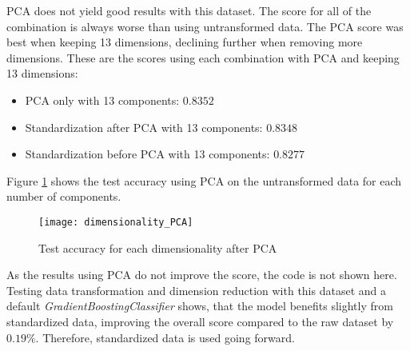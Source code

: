 \ac{PCA} does not yield good results with this dataset. The score for all of the combination is always worse
than using untransformed data. 
The PCA score was best when keeping 13 dimensions, declining further when removing more dimensions.
These are the scores using each combination with PCA and keeping 13 dimensions:

\begin{itemize}
    \item PCA only with 13 components: $0.8352$
    \item Standardization after PCA with 13 components: $0.8348$
    \item Standardization before PCA with 13 components: $0.8277$
\end{itemize}

Figure \ref{fig:Score for each PCA dimensionality} shows the test accuracy using PCA on the untransformed data
for each number of components.

\begin{figure}[H]
    \caption{Test accuracy for each dimensionality after PCA}
	\label{fig:Score for each PCA dimensionality}
    \texttt{[image: dimensionality\_PCA]}
\end{figure}

As the results using \ac{PCA} do not improve the score, the code is not shown here.
Testing data transformation and dimension reduction with this dataset and a default \emph{GradientBoostingClassifier}
shows, that the model benefits slightly from standardized data, improving the overall score compared to the raw dataset
by $0.19\%$. Therefore, standardized data is used going forward.


